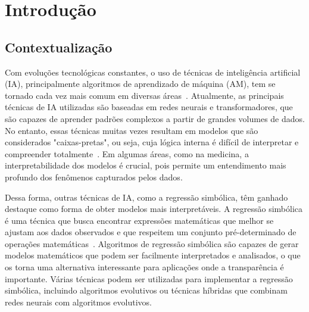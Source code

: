 \chapter{Introdução}
\section{Contextualização}

Com evoluções tecnológicas constantes, o uso de técnicas de inteligência artificial (IA), principalmente algoritmos de aprendizado de máquina (AM), tem se tornado cada vez mais comum em diversas áreas~\cite{Makke2024}. Atualmente, as principais técnicas de IA utilizadas são baseadas em redes neurais e transformadores, que são capazes de aprender padrões complexos a partir de grandes volumes de dados. No entanto, essas técnicas muitas vezes resultam em modelos que são considerados "caixas-pretas", ou seja, cuja lógica interna é difícil de interpretar e compreender totalmente~\cite{eggp}. Em algumas áreas, como na medicina, a interpretabilidade dos modelos é crucial, pois permite um entendimento mais profundo dos fenômenos capturados pelos dados.

Dessa forma, outras técnicas de IA, como a regressão simbólica, têm ganhado destaque como forma de obter modelos mais interpretáveis. A regressão simbólica é uma técnica que busca encontrar expressões matemáticas que melhor se ajustam aos dados observados e que respeitem um conjunto pré-determinado de operações matemáticas~\cite{eggp,rEGGression,Bartlett_2024}. Algoritmos de regressão simbólica são capazes de gerar modelos matemáticos que podem ser facilmente interpretados e analisados, o que os torna uma alternativa interessante para aplicações onde a transparência é importante. Várias técnicas podem ser utilizadas para implementar a regressão simbólica, incluindo algoritmos evolutivos ou técnicas híbridas que combinam redes neurais com algoritmos evolutivos.

